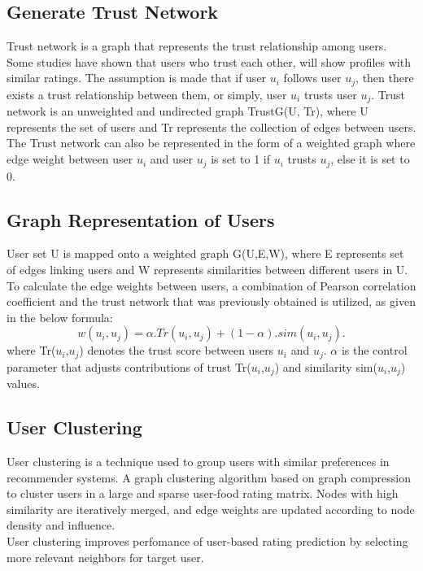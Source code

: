 \subsection{Generate Trust Network}
Trust network is a graph that represents the trust relationship among users. Some studies have shown that users who trust each other, will show profiles with similar ratings\cite*{MORADI2015462}. The assumption is made that if user $u_i$ follows user $u_j$, then there exists a trust relationship between them, or simply, user $u_i$ trusts user $u_j$. Trust network\cite*{9775081, oulu_tdlgc} is an unweighted and undirected graph TrustG(U, Tr), where U represents the set of users and Tr represents the collection of edges between users.
\\
\indent The Trust network can also be represented in the form of a weighted graph where edge weight between user $u_i$ and user $u_j$ is set to 1 if $u_i$ trusts $u_j$, else it is set to 0.

\subsection{Graph Representation of Users}
User set U is mapped onto a weighted graph G(U,E,W)\cite*{9775081, oulu_tdlgc}, where E represents set of edges linking users and W represents similarities between different users in U. To calculate the edge weights between users, a combination of Pearson correlation coefficient and the trust network that was previously obtained is utilized\cite*{9775081}, as given in the below formula:
\begin{equation*} w(u_{i},u_{j})=\alpha.Tr\left({u_{i},u_{j}}\right)+\left({1-\alpha }\right).sim\left({u_{i},u_{j}}\right). \tag{3}\end{equation*}
where Tr($u_i$,$u_j$) denotes the trust score between users $u_i$ and $u_j$.
$\alpha$ is the control parameter that adjusts contributions of trust Tr($u_i$,$u_j$) and similarity sim($u_i$,$u_j$) values.

\subsection{User Clustering}
User clustering is a technique used to group users with similar preferences in recommender systems. A graph clustering algorithm based on graph compression\cite*{ZHAO2021358} to cluster users in a large and sparse user-food rating matrix. Nodes with high similarity are iteratively merged, and edge weights are updated according to node density and influence.
\\
\indent User clustering improves perfomance of user-based rating prediction by selecting more relevant neighbors for target user.

